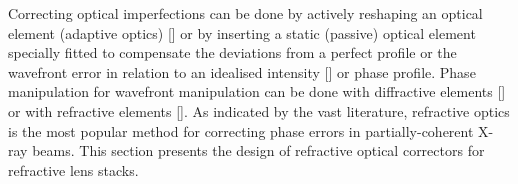 \begin{refsection}
Correcting optical imperfections can be done by actively reshaping an optical element (adaptive optics) [\cite{Sutter2012, Alcock2013}] or by inserting a static (passive) optical element specially fitted to compensate the deviations from a perfect profile or the wavefront error in relation to an idealised intensity [\cite{Donato2020}] or phase profile. Phase manipulation for wavefront manipulation can be done with diffractive elements [\cite{Probst2020}] or with refractive elements [\cite{Sawhney2016,Seiboth2017,Laundy2019,Seiboth2020, Dhamgaye2020}]. As indicated by the vast literature, refractive optics is the most popular method for correcting phase errors in partially-coherent X-ray beams. This section presents the design of refractive optical correctors for refractive lens stacks.


\end{refsection}
